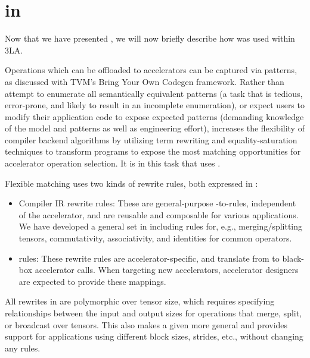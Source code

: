 \section{\g in \TLA}
\label{sec:glenside-in-3la}

Now that we have presented
  \g,
  we will now briefly describe
  how \g was used within 3LA.

Operations which can be offloaded
  to accelerators
  can be captured via patterns,
  as discussed with 
  TVM's Bring Your Own Codegen
  framework.
Rather than attempt to enumerate all semantically equivalent patterns
 (a task that is tedious, error-prone, and likely to result in an incomplete enumeration), 
 or expect users to modify their application code to expose expected patterns (demanding knowledge of the model and patterns
  as well as engineering effort), 
   \TLA 
   increases the flexibility
   of compiler backend algorithms
  by utilizing term rewriting and \gls{equality-saturation} techniques to transform programs
  to expose the most  matching opportunities for accelerator operation selection. 
It is in this task
  that 
  \TLA uses \g.

Flexible matching uses two kinds of rewrite rules, both expressed in \g:
\begin{itemize}
\item Compiler IR rewrite rules: These are general-purpose \g-to-\g rules, independent of the accelerator, and are reusable and composable for various applications. We have developed a general set in \TLA %
including rules for, e.g., merging/splitting tensors, commutativity, associativity, and identities for common operators. 

\item \mapping rules: These rewrite rules are accelerator-specific,
  and translate from \g to black-box
  accelerator calls.
When targeting new accelerators, accelerator designers are expected to provide these mappings.
\end{itemize}

All rewrites in {\TLA} are polymorphic over tensor size, which requires specifying relationships between the input and output sizes for operations that merge, split, or broadcast over tensors. This also makes a given \mapping more general and provides support for applications using different block sizes, strides, etc., without changing any rules. 

